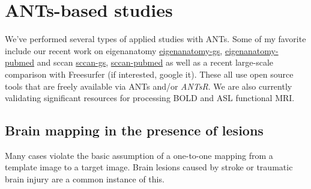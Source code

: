 \documentclass{InsightArticle}
\begin{document}
%
%
\newpage
\section{ANTs-based studies}
We've performed several types of applied studies with ANTs.  Some of
my favorite include our recent work on eigenanatomy
\href{http://scholar.google.com/scholar?q=eigenanatomy+avants&btnG=&hl=en&as_sdt=0%2C39}{eigenanatomy-gs},
\href{http://www.ncbi.nlm.nih.gov/pubmed/?term=eigenanatomy}{eigenanatomy-pubmed}
and sccan \href{http://scholar.google.com/scholar?q=canonical+correlation+avants&btnG=&hl=en&as_sdt=0%2C39}{sccan-gs},
\href{http://www.ncbi.nlm.nih.gov/pubmed/?term=canonical+correlation+avants}{sccan-pubmed} 
\href{}{} as well as a recent large-scale comparison with Freesurfer (if interested,
google it).  These all use open source tools that are freely available
via ANTs and/or \textit{ANTsR}.  We are also currently validating significant
resources for processing BOLD and ASL functional MRI.

\subsection{Brain mapping in the presence of lesions}
Many cases violate the basic assumption of a one-to-one mapping from a
template image to a target image. Brain lesions caused by stroke or
traumatic brain injury are a common instance of this.
\end{document}
